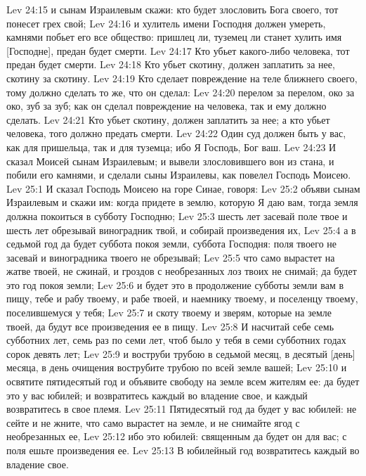 \vs Lev 24:15 и сынам Израилевым скажи: кто будет злословить Бога своего, тот понесет грех свой;
\vs Lev 24:16 и хулитель имени Господня должен умереть, камнями побьет его все общество: пришлец ли, туземец ли станет хулить имя [Господне], предан будет смерти.
\vs Lev 24:17 Кто убьет какого-либо человека, тот предан будет смерти.
\vs Lev 24:18 Кто убьет скотину, должен заплатить за нее, скотину за скотину.
\vs Lev 24:19 Кто сделает повреждение на теле ближнего своего, тому должно сделать то же, что он сделал:
\vs Lev 24:20 перелом за перелом, око за око, зуб за зуб; как он сделал повреждение на  человека, так и ему должно сделать.
\vs Lev 24:21 Кто убьет скотину, должен заплатить за нее; а кто убьет человека, того должно предать смерти.
\vs Lev 24:22 Один суд должен быть у вас, как для пришельца, так и для туземца; ибо Я Господь, Бог ваш.
\vs Lev 24:23 И сказал Моисей сынам Израилевым; и вывели злословившего вон из стана, и побили его камнями, и сделали сыны Израилевы, как повелел Господь Моисею.
\vs Lev 25:1 И сказал Господь Моисею на горе Синае, говоря:
\vs Lev 25:2 объяви сынам Израилевым и скажи им: когда придете в землю, которую Я даю вам, тогда земля должна покоиться в субботу Господню;
\vs Lev 25:3 шесть лет засевай поле твое и шесть лет обрезывай виноградник твой, и собирай произведения их,
\vs Lev 25:4 а в седьмой год да будет суббота покоя земли, суббота Господня: поля твоего не засевай и виноградника твоего не обрезывай;
\vs Lev 25:5 что само вырастет на жатве твоей, не сжинай, и гроздов с необрезанных лоз твоих не снимай; да будет это год покоя земли;
\vs Lev 25:6 и будет это в продолжение субботы земли  вам в пищу, тебе и рабу твоему, и рабе твоей, и наемнику твоему, и поселенцу твоему, поселившемуся у тебя;
\vs Lev 25:7 и скоту твоему и зверям, которые на земле твоей, да будут все произведения ее в пищу.
\rsbpar\vs Lev 25:8 И насчитай себе семь субботних лет, семь раз по семи лет, чтоб было у тебя в семи субботних годах сорок девять лет;
\vs Lev 25:9 и воструби трубою в седьмой месяц, в десятый [день] месяца, в день очищения вострубите трубою по всей земле вашей;
\vs Lev 25:10 и освятите пятидесятый год и объявите свободу на земле всем жителям ее: да будет это у вас юбилей; и возвратитесь каждый во владение свое, и каждый возвратитесь в свое племя.
\vs Lev 25:11 Пятидесятый год да будет у вас юбилей: не сейте и не жните, что само вырастет на земле, и не снимайте ягод с необрезанных  ее,
\vs Lev 25:12 ибо это юбилей: священным да будет он для вас; с поля ешьте произведения ее.
\vs Lev 25:13 В юбилейный год возвратитесь каждый во владение свое.
